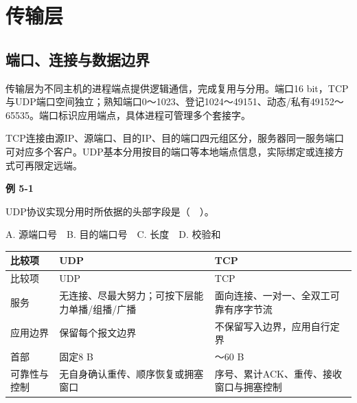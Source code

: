 \chapter{传输层}\label{CN05}

\section{端口、连接与数据边界}\label{CN05-endpoints}

传输层为不同主机的进程端点提供逻辑通信，完成复用与分用。端口16 bit，TCP与UDP端口空间独立；熟知端口0～1023、登记1024～49151、动态/私有49152～65535。端口标识应用端点，具体进程可管理多个套接字。

TCP连接由源IP、源端口、目的IP、目的端口四元组区分，服务器同一服务端口可对应多个客户。UDP基本分用按目的端口等本地端点信息，实际绑定或连接方式可再限定远端。

\par\medskip{}\noindent\hypertarget{CN05-E01}{}\label{CN05-E01}\textbf{例 5-1}\par\nobreak\smallskip

UDP协议实现分用时所依据的头部字段是（　）。

A. 源端口号　B. 目的端口号　C. 长度　D. 校验和

\par\smallskip
\begin{wideblock}
{\fontsize{9.3}{12}\selectfont\setlength{\tabcolsep}{2.5pt}\setlength{\LTleft}{0pt}\setlength{\LTright}{0pt}
\begin{longtable}{@{}>{\raggedright\arraybackslash}p{}>{\raggedright\arraybackslash}p{}>{\raggedright\arraybackslash}p{}@{}}
\toprule
比较项 & UDP & TCP \\

\midrule\endfirsthead\toprule
比较项 & UDP & TCP \\

\midrule\endhead\bottomrule\endfoot
服务 & 无连接、尽最大努力；可按下层能力单播/组播/广播 & 面向连接、一对一、全双工可靠有序字节流 \\

应用边界 & 保留每个报文边界 & 不保留写入边界，应用自行定界 \\

首部 & 固定8 B & 20～60 B \\

可靠性与控制 & 无自身确认重传、顺序恢复或拥塞窗口 & 序号、累计ACK、重传、接收窗口与拥塞控制 \\

\end{longtable}}
\end{wideblock}
\par\smallskip

